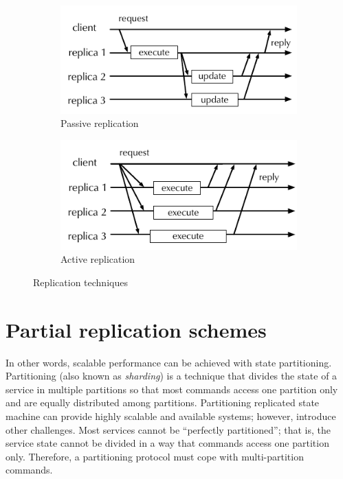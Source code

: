 \begin{figure}[ht!]
  \centering
  \begin{subfigure}[b]{0.49\textwidth}
    \centering
    \includegraphics[width=1\columnwidth]{figures/replication-passive}
    \caption{Passive replication}
    \label{fig:replication:passive}
  \end{subfigure}
  \begin{subfigure}[b]{0.49\textwidth}
    \centering
    \includegraphics[width=1\columnwidth]{figures/replication-active}
    \caption{Active replication}
    \label{fig:replication:active}
  \end{subfigure}
  \caption{Replication techniques}
  \label{fig:replication}
\end{figure}


\section{Partial replication schemes}


In other words, scalable performance can be achieved with state partitioning.
Partitioning (also known as \emph{sharding}) is a technique that divides the
state of a service in multiple partitions so that most commands access one
partition only and are equally distributed among partitions. Partitioning
replicated state machine can provide highly scalable and available systems;
however, introduce other challenges. Most services cannot be ``perfectly
partitioned''; that is, the service state cannot be divided in a way that
commands access one partition only. Therefore, a partitioning protocol must cope
with multi-partition commands.

